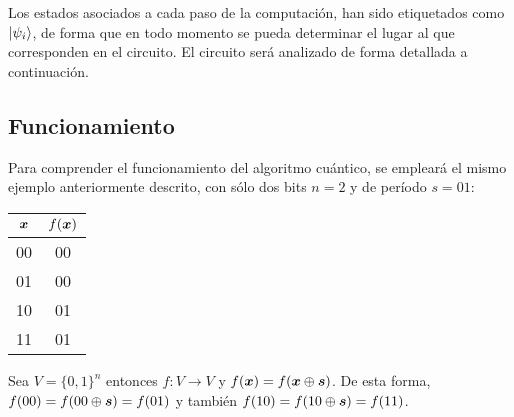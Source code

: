 Los estados asociados a cada paso de la computación, han sido etiquetados como 
$\ket{\psi_i}$, de forma que en todo momento se pueda determinar el lugar al que 
corresponden en el circuito. El circuito será analizado de forma detallada a 
continuación.

\subsection{Funcionamiento}
Para comprender el funcionamiento del algoritmo cuántico, se empleará el mismo 
ejemplo anteriormente descrito, con sólo dos bits $n=2$ y de período $s=01$:
%
\begin{center}
\begin{tabular}{|c|c|}
	\hline
	$\boldsymbol{x}$ & $f(\boldsymbol{x})$ \\
	\hline
	00 & 00 \\
	01 & 00 \\
	10 & 01 \\
	11 & 01 \\
	\hline
\end{tabular}
\end{center}
%
Sea $V = \{0,1\}^n$ entonces $f:V\rightarrow V$ y $f(\boldsymbol{x}) = f(\boldsymbol{x}\oplus \boldsymbol{s})$. De esta 
forma, $f(00) = f(00 \oplus \boldsymbol{s}) = f(01)$ y también $f(10) = f(10 \oplus \boldsymbol{s}) = 
f(11)$.

